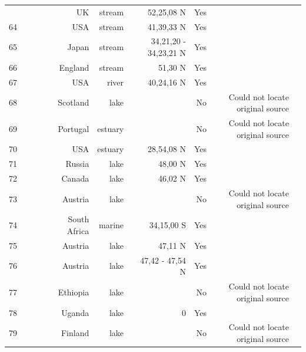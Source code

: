 \documentclass[12pt]{article}
\begin{document}
\begin{landscape}
\begin{table}[h!]
\begin{tabular}{rrrrrrrrr}
{      63    & ~\citet{GlobalWeb} & ~\citet{Jones1950} & UK    & stream & 52,25,08 N & Yes   &       &  \\
      64    & ~\citet{GlobalWeb} & ~\citet{Cummins1966} & USA   & stream & 41,39,33 N & Yes   &       &  \\
      65    & ~\citet{GlobalWeb} & ~\citet{Tsuda1972} & Japan & stream & 34,21,20 - 34,23,21 N & Yes   &       &  \\
      66    & ~\citet{GlobalWeb} & ~\citet{Mann1972a} & England & stream & 51,30 N & Yes   &       &  \\
      67    & ~\citet{GlobalWeb} & ~\citet{Carlson1968} & USA   & river} & 40,24,16 N & Yes   &       &  \\
      68    & ~\citet{GlobalWeb} & ~\citet{Morgan1972} & Scotland & lake &       & No    & Could not locate original source &  \\
      69    & ~\citet{GlobalWeb} & ~\citet{Cohen1990} & Portugal & estuary &       & No    & Could not locate original source &  \\
      70    & ~\citet{GlobalWeb} & ~\citet{Kemp1977} & USA   & estuary & 28,54,08 N & Yes   &       &  \\
      71    & ~\citet{GlobalWeb} & ~\citet{Sorokin1972} & Russia & lake & 48,00 N & Yes   &       &  \\
      72    & ~\citet{GlobalWeb} & ~\citet{Baril1983} & Canada & lake & 46,02 N & Yes   &       &  \\
      73    & ~\citet{GlobalWeb} & ~\citet{Schiemer1979} & Austria & lake &       & No    & Could not locate original source &  \\
      74    & ~\citet{GlobalWeb} & ~\citet{Cohen1990} & South Africa & marine & 34,15,00 S & Yes   &       &  \\
      75    & ~\citet{GlobalWeb} & ~\citet{Pechlaner1972} & Austria & lake & 47,11 N & Yes   &       &  \\
      76    & ~\citet{GlobalWeb} & ~\citet{Schiemer1979} & Austria & lake & 47,42 - 47,54 N & Yes   &       &  \\
      77    & ~\citet{GlobalWeb} & ~\citet{Cohen1990} & Ethiopia & lake &       & No    & Could not locate original source &  \\
      78    & ~\citet{GlobalWeb} & ~\citet{Burgis1972} & Uganda & lake & 0     & Yes   &       &  \\
      79    & ~\citet{GlobalWeb} & ~\citet{Sarvala1974} & Finland & lake &       & No    & Could not locate original source &  \\

\end{tabular}
\end{table}
\end{landscape}
\end{document}
